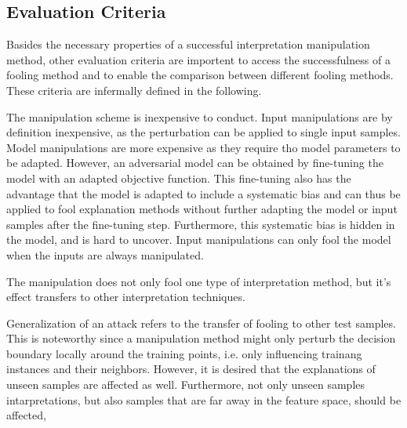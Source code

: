 
\subsection{Evaluation Criteria}
\label{subsec:eval_criteria_manipulations}
Basides the necessary properties of a successful interpretation manipulation method, other evaluation criteria are importent to access the successfulness of a fooling method and to enable the comparison between different fooling methods. These criteria are infermally defined in the following.

 The manipulation scheme is inexpensive to conduct. Input manipulations are by definition inexpensive, as the perturbation can be applied to single input samples. Model manipulations are more expensive as they require tho model parameters to be adapted. However, an adversarial model can be obtained by fine-tuning the model with an adapted objective function. This fine-tuning also has the advantage that the model is adapted to include a systematic bias and can thus be applied to fool explanation methods without further adapting the model or input samples after the fine-tuning step. Furthermore, this systematic bias is hidden in the model, and is hard to uncover. Input manipulations can only fool the model when the inputs are always manipulated. 

 The manipulation does not only fool one type of interpretation method, but it's effect transfers to other interpretation techniques. 


 Generalization of an attack refers to the transfer of fooling to other test samples. This is noteworthy since a manipulation method might only perturb the decision boundary locally around the training points, i.e. only influencing trainang instances and their neighbors. However, it is desired that the explanations of unseen samples are affected as well. Furthermore, not only unseen samples intarpretations, but also samples that are far away in the feature space, should be affected,

